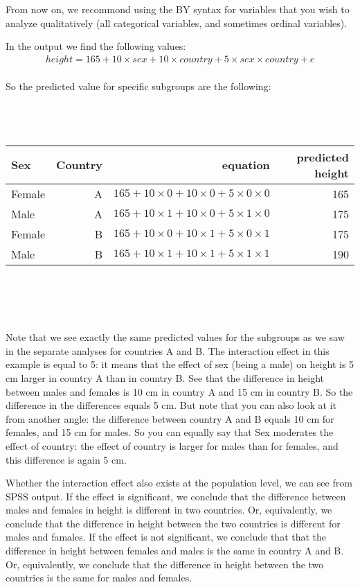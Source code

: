 From now on, we recommond using the BY syntax for variables that you wish to analyze qualitatively (all categorical variables, and sometimes ordinal variables).


In the output we find the following values:
\\
\begin{eqnarray} 
height = 165 + 10  \times sex + 10 \times country +  5 \times sex \times country + e \nonumber
\end{eqnarray}
\\
So the predicted value for specific subgroups are the following:
\\
 \\
 \\
 \\
 \begin{tabular}{lrrr}
 Sex & Country & equation & predicted height\\ \hline
 Female & A & $165+10  \times 0 + 10 \times 0 +  5 \times 0 \times 0 $ & 165\\
 Male & A & $165+10  \times 1 + 10 \times 0 +  5 \times 1 \times 0 $ & 175\\
 Female & B & $165+10  \times 0 + 10 \times 1 +  5 \times 0 \times 1 $ & 175\\
 Male & B & $165+10  \times 1 + 10 \times 1 +  5 \times 1 \times 1 $ & 190\\
 \end{tabular}
\\
\\
\\
 \\
Note that we see exactly the same predicted values for the subgroups as we saw in the separate analyses for countries A and B. The interaction effect in this example is equal to 5: it means that the effect of sex (being a male) on height is 5 cm larger in country A than in country B. See that the difference in height between males and females is 10 cm in country A and 15 cm in country B. So the difference in the differences equals 5 cm. But note that you can also look at it from another angle: the difference between country A and B equals 10 cm for females, and 15 cm for males. So you can equally say that Sex moderates the effect of country: the effect of country is larger for males than for females, and this difference is again 5 cm. 


Whether the interaction effect also exists at the population level, we can see from SPSS output. If the effect is significant, we conclude that the difference between males and females in height is different in two countries. Or, equivalently, we conclude that the difference in height between the two countries is different for males and famales. If the effect is not significant, we conclude that that the difference in height between females and males is the same in country A and B. Or, equivalently, we conclude that the difference in height between the two countries is the same for males and females.




